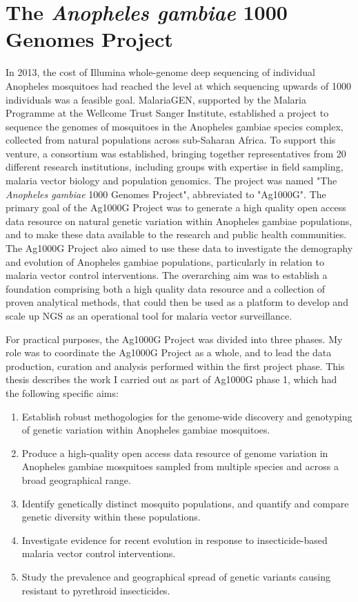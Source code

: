 \documentclass[a4paper,11pt,abstracton,hidelinks]{scrartcl}
\begin{document}
\section{The \textit{Anopheles gambiae} 1000 Genomes Project}


In 2013, the cost of Illumina whole-genome deep sequencing of individual Anopheles mosquitoes had reached the level at which sequencing upwards of 1000 individuals was a feasible goal.
%
MalariaGEN, supported by the Malaria Programme at the Wellcome Trust Sanger Institute, established a project to sequence the genomes of mosquitoes in the Anopheles gambiae species complex, collected from natural populations across sub-Saharan Africa.
%
To support this venture, a consortium was established, bringing together representatives from 20 different research institutions, including groups with expertise in field sampling, malaria vector biology and population genomics.
%
The project was named "The \textit{Anopheles gambiae} 1000 Genomes Project", abbreviated to "Ag1000G".
%
The primary goal of the Ag1000G Project was to generate a high quality open access data resource on natural genetic variation within Anopheles gambiae populations, and to make these data available to the research and public health communities.
%
The Ag1000G Project also aimed to use these data to investigate the demography and evolution of Anopheles gambiae populations, particularly in relation to malaria vector control interventions.
%
The overarching aim was to establish a foundation comprising both a high quality data resource and a collection of proven analytical methods, that could then be used as a platform to develop and scale up NGS as an operational tool for malaria vector surveillance.


For practical purposes, the Ag1000G Project was divided into three phases.
%
My role was to coordinate the Ag1000G Project as a whole, and to lead the data production, curation and analysis performed within the first project phase.
%
This thesis describes the work I carried out as part of Ag1000G phase 1, which had the following specific aims:
%
\begin{enumerate}
%
\item Establish robust methogologies for the genome-wide discovery and genotyping of genetic variation within Anopheles gambiae mosquitoes.
%
\item Produce a high-quality open access data resource of genome variation in Anopheles gambiae mosquitoes sampled from multiple species and across a broad geographical range.
%
\item Identify genetically distinct mosquito populations, and quantify and compare genetic diversity within these populations.
%
\item Investigate evidence for recent evolution in response to insecticide-based malaria vector control interventions. 
%
\item Study the prevalence and geographical spread of genetic variants causing resistant to pyrethroid insecticides.
%
\end{enumerate}
\end{document}
